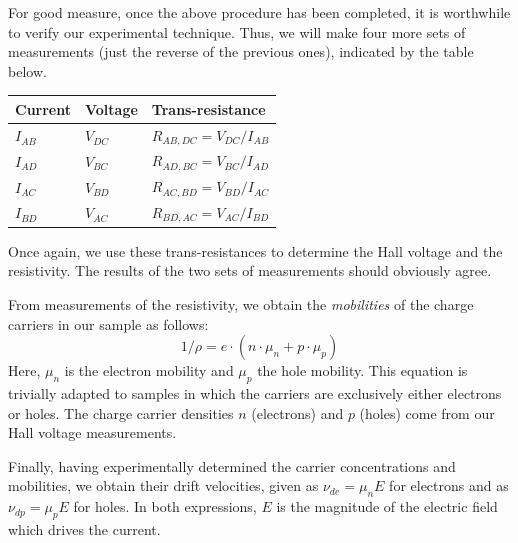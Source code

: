 \documentclass{../lab}
\begin{document}
For good measure, once the above procedure has been completed, it is worthwhile to verify our experimental technique. Thus, we will make four more sets of measurements (just the reverse of the previous ones), indicated by the table below.

\begin{center}
    \begin{tabular}{l|l|l}
        Current  & Voltage  & Trans-resistance \\\hline
        $I_{AB}$ & $V_{DC}$ & $R_{AB,DC} = V_{DC} / I_{AB}$ \\\hline
        $I_{AD}$ & $V_{BC}$ & $R_{AD,BC} = V_{BC} / I_{AD}$ \\\hline
        $I_{AC}$ & $V_{BD}$ & $R_{AC,BD} = V_{BD} / I_{AC}$ \\\hline
        $I_{BD}$ & $V_{AC}$ & $R_{BD,AC} = V_{AC} / 
        I_{BD}$
    \end{tabular}
\end{center}

Once again, we use these trans-resistances to determine the Hall voltage and the resistivity. The results of the two sets of measurements should obviously agree.

From measurements of the resistivity, we obtain the \emph{mobilities} of the charge carriers in our sample as follows:
\begin{equation}
    1/\rho = e \cdot (n\cdot\mu_n + p\cdot\mu_p)
\end{equation}
Here, $\mu_n$ is the electron mobility and $\mu_p$ the hole mobility. This equation is trivially adapted to samples in which the carriers are exclusively either electrons or holes. The charge carrier densities $n$ (electrons) and $p$ (holes) come from our Hall voltage measurements.

Finally, having experimentally determined the carrier concentrations and mobilities, we obtain their drift velocities, given as $\nu_{de} = \mu_n E$ for electrons and as $\nu_{dp} = \mu_p E$ for holes. In both expressions, $E$ is the magnitude of the electric field which drives the current.
\end{document}
